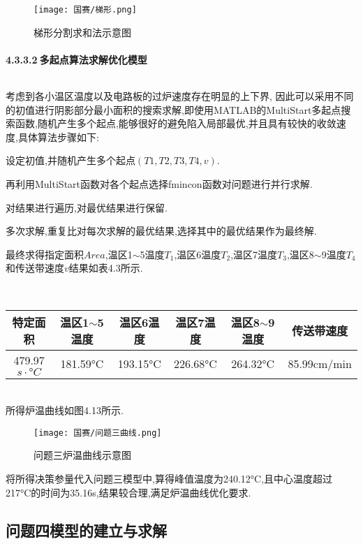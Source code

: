 \documentclass[12pt]{ctexart}
\numberwithin{figure}{section}
\numberwithin{table}{section}
\begin{document}
\begin{figure}[!htp]
    \centering
    \setlength{\belowcaptionskip}{0pt}
    \texttt{[image: 国赛/梯形.png]}
    \caption{梯形分割求和法示意图}
    \label{tab:图1}
\end{figure}

\paragraph{4.3.3.2$\ $多起点算法求解优化模型}$\ $

考虑到各小温区温度以及电路板的过炉速度存在明显的上下界, 因此可以采用不同的初值进行阴影部分最小面积的搜索求解,即使用MATLAB的MultiStart多起点搜索函数,随机产生多个起点,能够很好的避免陷入局部最优,并且具有较快的收敛速度,具体算法步骤如下:

设定初值,并随机产生多个起点$(T1,T2,T3,T4,v)$.

再利用MultiStart函数对各个起点选择fmincon函数对问题进行并行求解.

对结果进行遍历,对最优结果进行保留.

多次求解,重复比对每次求解的最优结果,选择其中的最优结果作为最终解.


最终求得指定面积$Area$,温区1$\sim$5温度$T_1$,温区6温度$T_2$,温区7温度$T_3$,温区8$\sim$9温度$T_4$和传送带速度$v$结果如表4.3所示.
\begin{longtable}
\centering
\setlength{\abovecaptionskip}{0pt}
\caption{问题三所求结果数据表}
\label{}\\
\begin{tabular}{c|c|c|c|c|c}
\hline
特定面积&温区1$\sim$5温度&温区6温度&温区7温度&温区8$\sim$9温度&传送带速度\\
\hline
479.97$s\cdot°C$&181.59°C&193.15°C&226.68°C&264.32°C&85.99cm/min\\
\hline
    \end{tabular}
    \end{longtable}\\
    所得炉温曲线如图4.13所示.
    \begin{figure}[!htp]
    \centering
    \setlength{\belowcaptionskip}{0pt}
    \texttt{[image: 国赛/问题三曲线.png]}
    \caption{问题三炉温曲线示意图}
    \label{tab:图1}
\end{figure}

将所得决策参量代入问题三模型中,算得峰值温度为240.12°C,且中心温度超过217°C的时间为35.16s,结果较合理,满足炉温曲线优化要求.
\newpage
\subsection{问题四模型的建立与求解}
\end{document}
